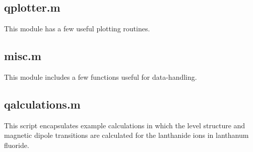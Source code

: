 \documentclass{article}
\begin{document}
\subsection{qplotter.m}

This module has a few useful plotting routines.



\subsection{misc.m}

This module includes a few functions useful for data-handling.



\subsection{qalculations.m}

This script encapsulates example calculations in which the level structure and magnetic dipole transitions are calculated for the lanthanide ions in lanthanum fluoride.



\newpage

\printbibliography
\end{document}

